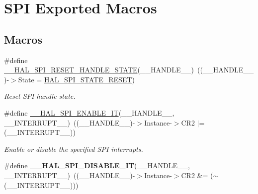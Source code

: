 \hypertarget{group___s_p_i___exported___macros}{}\section{S\+PI Exported Macros}
\label{group___s_p_i___exported___macros}
\subsection*{Macros}
\begin{DoxyCompactItemize}
\item 
\#define \hyperlink{group___s_p_i___exported___macros_ga0d846f9517715960873e854b4a0790b0}{\+\_\+\+\_\+\+H\+A\+L\+\_\+\+S\+P\+I\+\_\+\+R\+E\+S\+E\+T\+\_\+\+H\+A\+N\+D\+L\+E\+\_\+\+S\+T\+A\+TE}(\+\_\+\+\_\+\+H\+A\+N\+D\+L\+E\+\_\+\+\_\+)~((\+\_\+\+\_\+\+H\+A\+N\+D\+L\+E\+\_\+\+\_\+)-\/$>$State = \hyperlink{group___s_p_i___exported___types_gga8891cb64e76198a860172d94c638c9b4adbc218df2c9841b561282b40b3ded69d}{H\+A\+L\+\_\+\+S\+P\+I\+\_\+\+S\+T\+A\+T\+E\+\_\+\+R\+E\+S\+ET})
\begin{DoxyCompactList}\small\item\em Reset S\+PI handle state. \end{DoxyCompactList}\item 
\#define \hyperlink{group___s_p_i___exported___macros_ga76064652f6f56d8868720b5541e854f5}{\+\_\+\+\_\+\+H\+A\+L\+\_\+\+S\+P\+I\+\_\+\+E\+N\+A\+B\+L\+E\+\_\+\+IT}(\+\_\+\+\_\+\+H\+A\+N\+D\+L\+E\+\_\+\+\_\+,  \+\_\+\+\_\+\+I\+N\+T\+E\+R\+R\+U\+P\+T\+\_\+\+\_\+)~((\+\_\+\+\_\+\+H\+A\+N\+D\+L\+E\+\_\+\+\_\+)-\/$>$Instance-\/$>$C\+R2 $\vert$= (\+\_\+\+\_\+\+I\+N\+T\+E\+R\+R\+U\+P\+T\+\_\+\+\_\+))
\begin{DoxyCompactList}\small\item\em Enable or disable the specified S\+PI interrupts. \end{DoxyCompactList}\item 
\#define {\bfseries \+\_\+\+\_\+\+H\+A\+L\+\_\+\+S\+P\+I\+\_\+\+D\+I\+S\+A\+B\+L\+E\+\_\+\+IT}(\+\_\+\+\_\+\+H\+A\+N\+D\+L\+E\+\_\+\+\_\+,  \+\_\+\+\_\+\+I\+N\+T\+E\+R\+R\+U\+P\+T\+\_\+\+\_\+)~((\+\_\+\+\_\+\+H\+A\+N\+D\+L\+E\+\_\+\+\_\+)-\/$>$Instance-\/$>$C\+R2 \&= ($\sim$(\+\_\+\+\_\+\+I\+N\+T\+E\+R\+R\+U\+P\+T\+\_\+\+\_\+)))\hypertarget{group___s_p_i___exported___macros_ga47fa7321c5755bfbff1a7229fbe5b21c}{}\label{group___s_p_i___exported___macros_ga47fa7321c5755bfbff1a7229fbe5b21c}


\end{DoxyCompactItemize}

